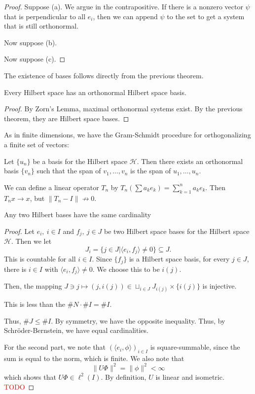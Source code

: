 \documentclass[twoside,symmetric, openany, 12pt]{./tuftebook}
\theoremstyle{definition}
\theoremstyle{definition}
\theoremstyle{definition}
\begin{document}
\begin{proof}
	Suppose (a). We argue in the contrapositive. If there is a nonzero vector $\psi$ that is perpendicular to all $e_i$, then we can append $\psi$ to the set to get a system that is still orthonormal.

	Now suppose (b). 

	Now suppose (c). 
\end{proof}
The existence of bases follows directly from the previous theorem.
\begin{Theorem}
	Every Hilbert space has an orthonormal Hilbert space basis.
\end{Theorem}
\begin{proof}
	By Zorn's Lemma, maximal orthonormal systems exist. By the previous theorem, they are Hilbert space bases.
\end{proof}
As in finite dimensions, we have the Gram-Schmidt procedure for orthogonalizing a finite set of vectors:
\begin{Theorem}
	Let $\{u_n\}$ be a basis for the Hilbert space $\mathcal{H}$. Then there exists an orthonormal basis $\{v_n\}$ such that the span of $v_1, \dots, v_n$ is the span of $u_1, \dots, u_n$.
\end{Theorem}
\begin{Example}
	We can define a linear operator $T_n$ by $T_n(\sum a_k e_k)=\sum_{k=1}^n a_k e_k$. Then $T_nx\to x$, but $\|T_n - I\|\not\to 0$.
\end{Example}

\begin{Theorem}
	Any two Hilbert bases have the same cardinality
\end{Theorem}
\begin{proof}
	Let $e_i,~i\in I$ and $f_j,~j\in J$ be two Hilbert space bases for the Hilbert space $\mathcal{H}$. Then we let
	\[
	J_i=\{j\in J| \langle e_i, f_j\rangle \neq 0\} \subseteq J
	.\] 
	This is countable for all $i\in I$. Since $\{f_j\} $ is a Hilbert space basis, for every $j\in J$, there is $i\in I$ with $\langle e_i, f_j\rangle \neq 0$. We choose this to be $i(j)$.

	Then, the mapping $J\ni j\mapsto (j, i(j)) \in \sqcup_{i\in J}J_{i(j)}\times \{i(j)\} $ is injective.

	This is less than the $\#N\cdot \#I = \#I$.

	Thus, $\# J \le \# I$. By symmetry, we have the opposite inequality. Thus, by Schr\"{o}der-Bernstein, we have equal cardinalities.

	For the second part, we note that $(\langle e_i, \phi\rangle)_{i\in I}$ is square-summable, since the sum is equal to the norm, which is finite. We also note that
	\[
	\|U \Phi\|^2 = \|\phi\|^2<\infty
\]
which shows that $U\Phi\in \ell^2(I)$. By definition, $U$ is linear and isometric. \textcolor{red}{TODO} 
\end{proof}
\end{document}

